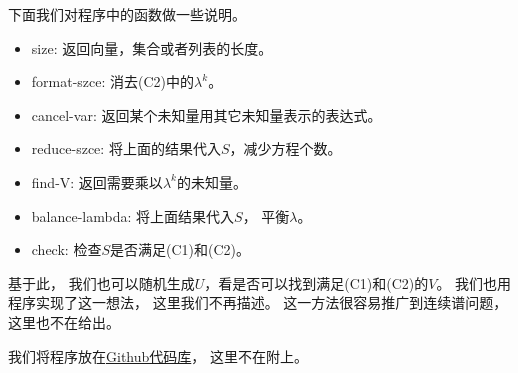 \documentclass[12pt,a4paper,hyperref]{ctexrep}
\begin{document}
下面我们对程序中的函数做一些说明。
\begin{itemize}
\item {\color{blue}size:} 返回向量，集合或者列表的长度。

\item {\color{blue}format-szce}: 消去(C2)中的$\lambda^k$。

\item {\color{blue}cancel-var}: 返回某个未知量用其它未知量表示的表达式。

\item {\color{blue}reduce-szce}: 将上面的结果代入$S$，减少方程个数。

\item {\color{blue}find-V}: 返回需要乘以$\lambda^k$的未知量。

\item {\color{blue}balance-lambda}: 将上面结果代入$S$， 平衡$\lambda$。

\item {\color{blue}check}: 检查$S$是否满足(C1)和(C2)。

\end{itemize}

基于此， 我们也可以随机生成$U$，看是否可以找到满足(C1)和(C2)的$V$。 我们也用程序实现了这一想法， 这里我们不再描述。 这一方法很容易推广到连续谱问题，这里也不在给出。

我们将程序放在\href{https://github.com/jiandandaoxingfu/derive-hierarchy-V}{Github代码库}， 这里不在附上。
\end{document}
